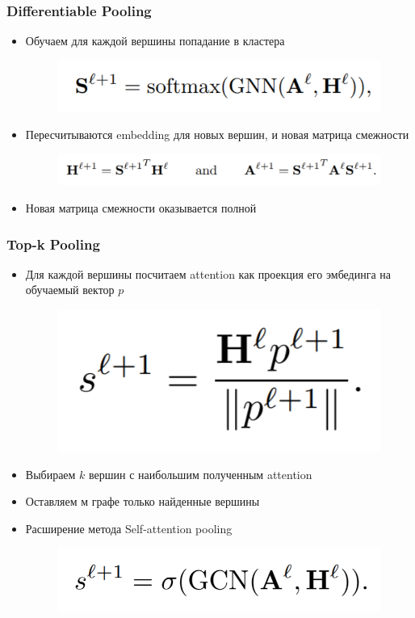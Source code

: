 \documentclass{beamer}
\begin{document}
\begin{frame}
\frametitle{Differentiable Pooling}
\begin{itemize}
	\item Обучаем для каждой вершины попадание в кластера
\begin{figure}
	\includegraphics[width=0.5\columnwidth]{softmax.png}
\end{figure}
	\item Пересчитываются embedding для новых вершин, и новая матрица смежности
	\begin{figure}
		\includegraphics[width=0.8\columnwidth]{differentaible_pooling.png}
	\end{figure}
	\item Новая матрица смежности оказывается полной
\end{itemize}
\end{frame}

\begin{frame}
\frametitle{Top-k Pooling}
\begin{itemize}
	\item Для каждой вершины посчитаем attention как проекция его эмбединга на обучаемый вектор $p$
	\begin{figure}
		\includegraphics[width=0.3\columnwidth]{top-k_pooing.png}
	\end{figure}
	\item Выбираем $k$ вершин с наибольшим полученным attention
	\item Оставляем м графе только найденные вершины
	\item Расширение метода Self-attention pooling
	\begin{figure}
		\includegraphics[width=0.5\columnwidth]{self-attention_pooing.png}
	\end{figure}
\end{itemize}
\end{frame}
\end{document}

